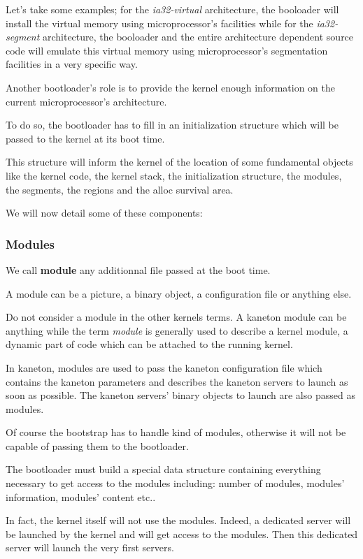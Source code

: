 Let's take some examples; for the \textit{ia32-virtual} architecture,
the booloader will install the virtual memory using microprocessor's
facilities while for the \textit{ia32-segment} architecture, the booloader
and the entire architecture dependent source code will emulate this
virtual memory using microprocessor's segmentation facilities in a very
specific way.

Another bootloader's role is to provide the kernel enough information
on the current microprocessor's architecture.

To do so, the bootloader has to fill in an initialization structure which
will be passed to the kernel at its boot time.

This structure will inform the kernel of the location of some
fundamental objects like the kernel code, the kernel stack, the initialization
structure, the modules, the segments, the regions and the alloc survival area.

We will now detail some of these components:

\subsubsection{Modules}

We call \textbf{module} any additionnal file passed at the boot time.

A module can be a picture, a binary object, a configuration file
or anything else.

Do not consider a module in the other kernels terms. A kaneton module
can be anything while the term \textit{module} is generally used to describe
a kernel module, a dynamic part of code which can be attached to the
running kernel.

In kaneton, modules are used to pass the kaneton configuration file
which contains the kaneton parameters and describes the kaneton servers
to launch as soon as possible. The kaneton servers' binary objects to
launch are also passed as modules.

Of course the bootstrap has to handle kind of modules, otherwise it will
not be capable of passing them to the bootloader.

The bootloader must build a special data structure containing everything
necessary to get access to the modules including: number of modules,
modules' information, modules' content etc..

In fact, the kernel itself will not use the modules. Indeed, a dedicated
server will be launched by the kernel and will get access to the modules.
Then this dedicated server will launch the very first servers.

